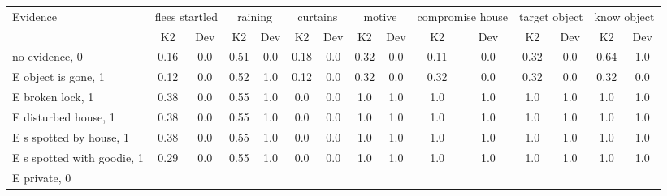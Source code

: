 \begin{table}\begin{tabular}{l|cc|cc|cc|cc|cc|cc|cc}\toprule\multirow{2}{*}{Evidence} & \multicolumn{2}{c}{flees startled}& \multicolumn{2}{c}{raining}& \multicolumn{2}{c}{curtains}& \multicolumn{2}{c}{motive}& \multicolumn{2}{c}{compromise house}& \multicolumn{2}{c}{target object}& \multicolumn{2}{c}{know object}\\& {K2} & {Dev}& {K2} & {Dev}& {K2} & {Dev}& {K2} & {Dev}& {K2} & {Dev}& {K2} & {Dev}& {K2} & {Dev}\\\midrule
no evidence, 0 & \cellcolor{Bittersweet}0.16&\cellcolor{Bittersweet}0.0&0.51&0.0&\cellcolor{Bittersweet}0.18&\cellcolor{Bittersweet}0.0&\cellcolor{Bittersweet}0.32&\cellcolor{Bittersweet}0.0&\cellcolor{Bittersweet}0.11&\cellcolor{Bittersweet}0.0&\cellcolor{Bittersweet}0.32&\cellcolor{Bittersweet}0.0&\cellcolor{Bittersweet}0.64&\cellcolor{Bittersweet}1.0\\E object is gone, 1 & \cellcolor{Bittersweet}0.12&\cellcolor{Bittersweet}0.0&0.52&1.0&\cellcolor{Bittersweet}0.12&\cellcolor{Bittersweet}0.0&\cellcolor{Bittersweet}0.32&\cellcolor{Bittersweet}0.0&\cellcolor{Bittersweet}0.32&\cellcolor{Bittersweet}0.0&\cellcolor{Bittersweet}0.32&\cellcolor{Bittersweet}0.0&\cellcolor{Bittersweet}0.32&\cellcolor{Bittersweet}0.0\\E broken lock, 1 & 0.38&0.0&0.55&1.0&\cellcolor{Bittersweet}0.0&\cellcolor{Bittersweet}0.0&\cellcolor{Bittersweet}1.0&\cellcolor{Bittersweet}1.0&\cellcolor{Bittersweet}1.0&\cellcolor{Bittersweet}1.0&\cellcolor{Bittersweet}1.0&\cellcolor{Bittersweet}1.0&\cellcolor{Bittersweet}1.0&\cellcolor{Bittersweet}1.0\\E disturbed house, 1 & \cellcolor{Bittersweet}0.38&\cellcolor{Bittersweet}0.0&0.55&1.0&\cellcolor{Bittersweet}0.0&\cellcolor{Bittersweet}0.0&\cellcolor{Bittersweet}1.0&\cellcolor{Bittersweet}1.0&\cellcolor{Bittersweet}1.0&\cellcolor{Bittersweet}1.0&\cellcolor{Bittersweet}1.0&\cellcolor{Bittersweet}1.0&\cellcolor{Bittersweet}1.0&\cellcolor{Bittersweet}1.0\\E s spotted by house, 1 & \cellcolor{Bittersweet}0.38&\cellcolor{Bittersweet}0.0&0.55&1.0&\cellcolor{Bittersweet}0.0&\cellcolor{Bittersweet}0.0&\cellcolor{Bittersweet}1.0&\cellcolor{Bittersweet}1.0&\cellcolor{Bittersweet}1.0&\cellcolor{Bittersweet}1.0&\cellcolor{Bittersweet}1.0&\cellcolor{Bittersweet}1.0&\cellcolor{Bittersweet}1.0&\cellcolor{Bittersweet}1.0\\E s spotted with goodie, 1 & \cellcolor{Bittersweet}0.29&\cellcolor{Bittersweet}0.0&0.55&1.0&\cellcolor{Bittersweet}0.0&\cellcolor{Bittersweet}0.0&\cellcolor{Bittersweet}1.0&\cellcolor{Bittersweet}1.0&\cellcolor{Bittersweet}1.0&\cellcolor{Bittersweet}1.0&\cellcolor{Bittersweet}1.0&\cellcolor{Bittersweet}1.0&\cellcolor{Bittersweet}1.0&\cellcolor{Bittersweet}1.0\\E private, 0 & 
\end{tabular}
\end{table}
